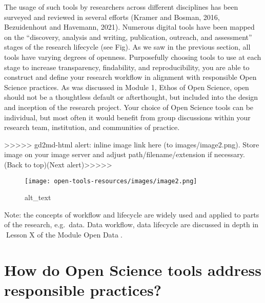 \documentclass[
  letterpaper,
  DIV=11,
  numbers=noendperiod]{scrreport}
\begin{document}
The usage of such tools by researchers across different disciplines has
been surveyed and reviewed in several efforts (Kramer and Bosman, 2016,
Bezuidenhout and Havemann, 2021). Numerous digital tools have been
mapped on the ``discovery, analysis and writing, publication, outreach,
and assessment'' stages of the research lifecycle (see Fig). As we saw
in the previous section, all tools have varying degrees of openness.
Purposefully choosing tools to use at each stage to increase
transparency, findability, and reproducibility, you are able to
construct and define your research workflow in alignment with
responsible Open Science practices. As was discussed in Module 1, Ethos
of Open Science, open should not be a thoughtless default or
afterthought, but included into the design and inception of the research
project. Your choice of Open Science tools can be individual, but most
often it would benefit from group discussions within your research team,
institution, and communities of practice.

{\textgreater\textgreater\textgreater\textgreater\textgreater{}
gd2md-html alert: inline image link here (to images/image2.png). Store
image on your image server and adjust path/filename/extension if
necessary. }(Back to top)(Next
alert){\textgreater\textgreater\textgreater\textgreater\textgreater{} }

\begin{figure}

{\centering \texttt{[image: open-tools-resources/images/image2.png]}

}

\caption{alt\_text}

\end{figure}

Note: the concepts of workflow and lifecycle are widely used and applied
to parts of the research, e.g.~data. Data workflow, data lifecycle are
discussed in depth in 🔗Lesson X of the Module Open Data🔗.

\hypertarget{how-do-open-science-tools-address-responsible-practices}{%
\section*{How do Open Science tools address responsible
practices?}\label{how-do-open-science-tools-address-responsible-practices}}

\end{document}
